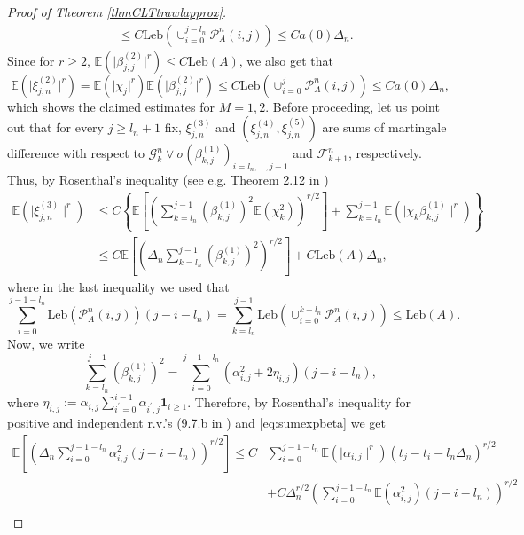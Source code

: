 \documentclass{article}
\theoremstyle{plain}
\theoremstyle{definition}
\theoremstyle{remark}
\begin{document}
\begin{appendix}
\begin{proof}[Proof of Theorem  \ref{thmCLTtrawlapprox}]
\begin{align*}
		& \leq C\mathrm{Leb}(\cup_{i=0}^{j-l_n}\mathcal{P}_{A}^{n}(i,j))\leq C a(0)\Delta_{n}.
	\end{align*}
Since for $r\geq2$, $\mathbb{E}(\rvert\beta_{j,j}^{(2)}\rvert^{r})\leq C\mathrm{Leb}(A)$, we also get that
\[\mathbb{E}(\rvert\xi_{j,n}^{(2)}\rvert^{r}) = \mathbb{E}(\rvert\chi_{j}\rvert^{r})\mathbb{E}(\rvert\beta_{j,j}^{(2)}\rvert^{r}) \leq C\mathrm{Leb}(\cup_{i=0}^{j}\mathcal{P}_{A}^{n}(i,j))\leq C a(0)\Delta_{n},
  \]
which shows the claimed estimates for $M=1,2$.   Before proceeding, let us point out that for every $j\geq l_n+1 $
	fix, $\xi_{j,n}^{(3)}$ and $(\xi_{j,n}^{(4)},\xi_{j,n}^{(5)})$
	are sums of martingale difference with respect to $\mathscr{G}_{k}^{n}\lor\sigma(\beta_{k,j}^{(1)})_{i=l_n,\ldots,j-1}$
	and $\mathscr{F}_{k+1}^{n}$, respectively. Thus, by Rosenthal's inequality
	(see e.g. Theorem 2.12 in \citet{HallHeyde80})
\begin{equation}
		\begin{aligned}\mathbb{E}(\mid\xi_{j,n}^{(3)}\mid^{r}) & \leq C\left\{ \mathbb{E}\left[\left(\sum_{k=l_{n}}^{j-1}(\beta_{k,j}^{(1)})^{2}\mathbb{E}(\chi_{k}^{2})\right)^{r/2}\right]+\sum_{k=l_{n}}^{j-1}\mathbb{E}(\mid\chi_{k}\beta_{k,j}^{(1)}\mid^{r})\right\} \\
			& \leq C\mathbb{E}\left[\left(\Delta_{n}\sum_{k=l_{n}}^{j-1}(\beta_{k,j}^{(1)})^{2}\right)^{r/2}\right]+C\mathrm{Leb}(A)\Delta_{n},
		\end{aligned}
		\label{mainineq3}
	\end{equation}
	where in the last inequality we used that 
	\begin{equation}
 \label{eq:sumexpbeta}
		\sum_{i=0}^{j-1-l_n}\mathrm{Leb}(\mathcal{P}_{A}^{n}(i,j))(j-i-l_n)=\sum_{k=l_n}^{j-1}\mathrm{Leb}(\cup_{i=0}^{k-l_n}\mathcal{P}_{A}^{n}(i,j))\leq\mathrm{Leb}(A).
	\end{equation}
	Now, we write
	\[
	\sum_{k=l_n}^{j-1}(\beta_{k,j}^{(1)})^{2}=\sum_{i=0}^{j-1-l_n}(\alpha_{i,j}^{2}+2\eta_{i,j})(j-i-l_n),
	\]
	where $\eta_{i,j}:=\alpha_{i,j}\sum_{i^{\prime}=0}^{i-1}\alpha_{i^{\prime},j}\mathbf{1}_{i\geq1}$.
	Therefore, by Rosenthal's inequality for positive and independent r.v.'s (9.7.b in \citet{LinBai10}) and \eqref{eq:sumexpbeta} we get
	\begin{align*}
		\mathbb{E}\left[\left(\Delta_{n}\sum_{i=0}^{j-1-l_n}\alpha_{i,j}^{2}(j-i-l_n)\right)^{r/2}\right]\leq C & \sum_{i=0}^{j-1-l_n}\mathbb{E}(\mid\alpha_{i,j}\mid^{r})(t_{j}-t_{i}-l_n\Delta_n)^{r/2}\\
		& +C\Delta_{n}^{r/2}\left(\sum_{i=0}^{j-1-l_n}\mathbb{E}(\alpha_{i,j}^{2})(j-i-l_n)\right)^{r/2}\\

\end{align*}
\end{proof}
\end{appendix}
\end{document}
